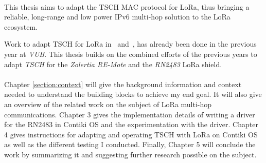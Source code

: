 \paragraph{}

This thesis aims to adapt the TSCH MAC protocol for LoRa,
thus bringing a reliable, long-range and low power IPv6 multi-hop
solution to the LoRa ecosystem.

Work to adapt TSCH for LoRa in~\cite{8847137} and~\cite{njomgang_2018}, has
already been done in the previous year at \emph{VUB}.
This thesis builds on the combined efforts of the previous
years to adapt \emph{TSCH} for the \emph{Zolertia RE-Mote} and the
\emph{RN2483} LoRa shield.

\paragraph{}

Chapter \ref{section:context} will give the background information and context needed to
understand the building blocks to achieve my end goal.
It will also give an overview of the related work on the subject of
LoRa multi-hop communications.
Chapter 3 gives the implementation details of writing a driver for the
RN2483 in Contiki OS and the experimentation with the driver.
Chapter 4 gives instructions for adapting and operating TSCH with LoRa on
Contiki OS as well as the different testing I conducted.
Finally, Chapter 5 will conclude the work by summarizing it and suggesting
further research possible on the subject.
